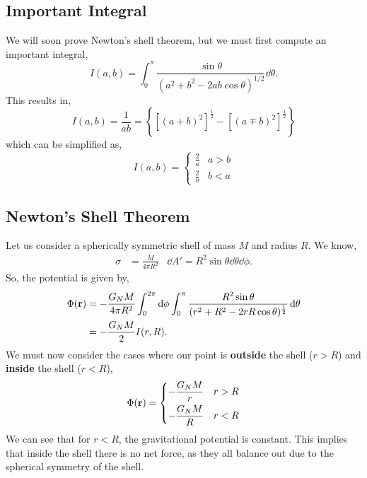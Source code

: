 \documentclass{book}
\begin{document}
\subsection{Important Integral}
We will soon prove Newton's shell theorem, but we must first compute an important integral,
\begin{equation}
    I(a,b) = \int_0^{\pi} \frac{\sin\theta}{(a^2 + b^2 - 2ab\cos\theta)^{1/2}}\dd{\theta}.
\end{equation}
This results in,
\begin{equation}
    I(a,b) = \frac{1}{ab} = \left\{\left[(a+b)^2\right]^{\frac{1}{2}}-\left[(a\mp b)^2\right]^{\frac{1}{2}}\right\}
\end{equation}
which can be simplified as,
\begin{equation}
    I(a,b) = \begin{cases}
        \frac{2}{a} & a > b  \\
        \frac{2}{b} & b < a
    \end{cases}
\end{equation}
\subsection{Newton's Shell Theorem}
Let us consider a spherically symmetric shell of mass $M$ and radius $R$. We know,
\begin{align}
    \sigma & = \frac{M}{4\pi R^2} & \dd{A}' = R^2\sin{\theta}\dd{\theta}\dd{\phi}.
\end{align}
So, the potential is given by,
\begin{equation}
    \begin{split}
        \Phi(\vb{r}) & = -\frac{G_NM}{4\pi R^2}\int_0^{2\pi}\dd{\phi} \int_0^{\pi}\frac{R^2\sin\theta}{(r^2 + R^2 - 2rR\cos\theta)^{\frac{1}{2}}}\dd{\theta} \\
        & = -\frac{G_NM}{2}I(r,R).
    \end{split}
\end{equation}
We must now consider the cases where our point is \textbf{outside} the shell ($r > R$) and \textbf{inside} the shell ($r < R$),
\begin{equation}
    \Phi(\vb{r}) = \begin{dcases}
        -\dfrac{G_NM}{r} & r > R \\
        -\dfrac{G_NM}{R} & r < R
    \end{dcases}
\end{equation}
We can see that for $r < R$, the gravitational potential is constant. This implies that inside the shell there is no net force, as they all balance out due to the spherical symmetry of the shell. 
\end{document}
